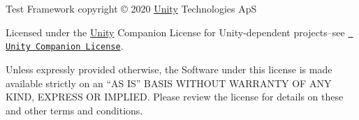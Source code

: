 Test Framework copyright © 2020 \mbox{\hyperlink{namespace_unity}{Unity}} Technologies ApS

Licensed under the \mbox{\hyperlink{namespace_unity}{Unity}} Companion License for Unity-\/dependent projects--see \href{http://www.unity3d.com/legal/licenses/Unity_Companion_License}{\texttt{ Unity Companion License}}.

Unless expressly provided otherwise, the Software under this license is made available strictly on an “\+AS I\+S” B\+A\+S\+IS W\+I\+T\+H\+O\+UT W\+A\+R\+R\+A\+N\+TY OF A\+NY K\+I\+ND, E\+X\+P\+R\+E\+SS OR I\+M\+P\+L\+I\+ED. Please review the license for details on these and other terms and conditions. 